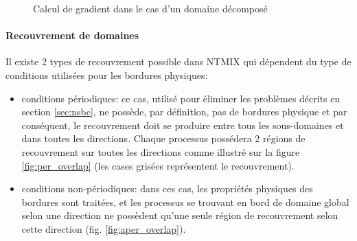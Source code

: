 \begin{figure}[!ht]
  \centering
  \caption{\label{fig:dfdx_decompo} Calcul de gradient dans le cas d'un domaine décomposé}
\end{figure}


\paragraph{Recouvrement de domaines}\label{sec:overlapping}
Il existe 2 types de recouvrement possible dans NTMIX qui dépendent du type de conditions utilisées pour les bordures physiques:
\begin{itemize}
\item conditions périodiques: ce cas, utilisé pour éliminer les problèmes décrits en section \ref{sec:nsbc}, ne possède, par définition, pas de bordures physique et par conséquent, le recouvrement doit se produire entre tous les sous-domaines et dans toutes les directions. Chaque processus possédera 2 régions de recouvrement sur toutes les directions comme illustré sur la figure \ref{fig:per_overlap} (les cases grisées représentent le recouvrement).
\item conditions non-périodiques: dans ces cas, les propriétés physiques des bordures sont traitées, et les processus se trouvant en bord de domaine global selon une direction ne possèdent qu'une seule région de recouvrement selon cette direction (fig. \ref{fig:aper_overlap}). 
\end{itemize}

